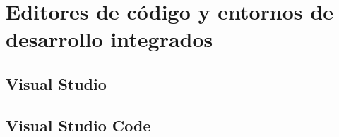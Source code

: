 \section{Editores de código y entornos de desarrollo integrados}

\subsection{Visual Studio}

\subsection{Visual Studio Code}
